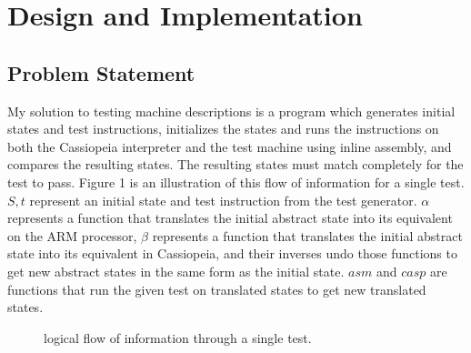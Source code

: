 \documentclass[letterpaper,12pt]{article}
\begin{document}
\section{Design and Implementation}

\subsection{Problem Statement}

My solution to testing machine descriptions is a program which generates initial states and test instructions, initializes the states and runs the instructions on both the Cassiopeia interpreter and the test machine using inline assembly, and compares the resulting states. The resulting states must match completely for the test to pass. Figure 1 is an illustration of this flow of information for a single test. $S, t$ represent an initial state and test instruction from the test generator. $\alpha$ represents a function that translates the initial abstract state into its equivalent on the ARM processor, $\beta$ represents a function that translates the initial abstract state into its equivalent in Cassiopeia, and their inverses undo those functions to get new abstract states in the same form as the initial state. $asm$ and $casp$ are functions that run the given test on translated states to get new translated states.

\begin{figure}
\centering
{}
\caption{logical flow of information through a single test.} \label{fig:M1}
\end{figure}
\end{document}
